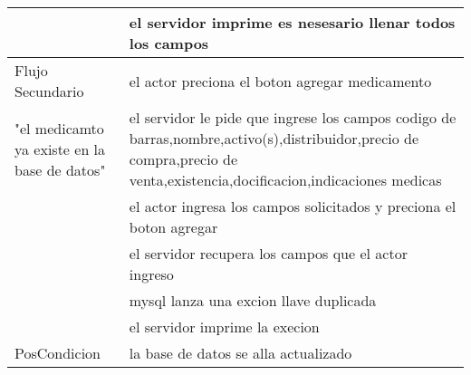 \documentclass{book}
\begin{document}
\begin{table}[H]
\begin{tabular}{p{3cm} p{11cm}}
				\\&el servidor imprime es nesesario llenar todos los campos\\
			\hline
				Flujo Secundario&el actor preciona el boton agregar medicamento\\
				"el medicamto ya existe en la base de datos"&el servidor le pide que ingrese los campos codigo de barras,nombre,activo(s),distribuidor,precio de compra,precio de venta,existencia,docificacion,indicaciones medicas
				\\&el actor ingresa los campos solicitados y preciona el boton agregar
				\\&el servidor recupera los campos que el actor ingreso
				\\&mysql lanza una excion llave duplicada
				\\&el servidor imprime la execion\\
			\hline
				PosCondicion&la base de datos se alla actualizado\\
			\hline
		\end{tabular}
	\end{table}
\end{document}
